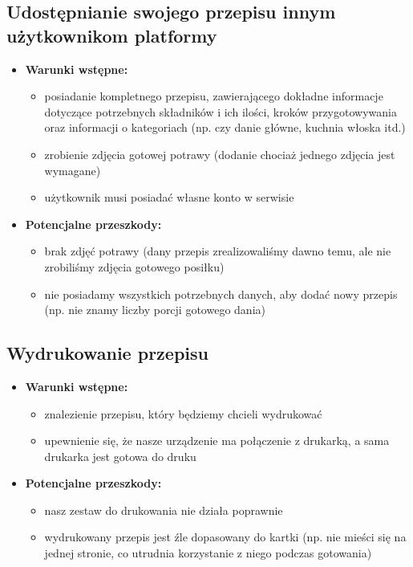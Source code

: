 \documentclass{article}
\begin{document}
\subsection{Udostępnianie swojego przepisu innym użytkownikom platformy}
  \begin{itemize}
    \item \textbf{Warunki wstępne:}
      \begin{itemize}
        \item posiadanie kompletnego przepisu, zawierającego dokładne informacje dotyczące potrzebnych składników i ich ilości, kroków przygotowywania oraz informacji o kategoriach (np. czy danie główne, kuchnia włoska itd.)
        \item zrobienie zdjęcia gotowej potrawy (dodanie chociaż jednego zdjęcia jest wymagane)
        \item użytkownik musi posiadać własne konto w serwisie
      \end{itemize}
    \item \textbf{Potencjalne przeszkody:}
      \begin{itemize}
        \item brak zdjęć potrawy (dany przepis zrealizowaliśmy dawno temu, ale nie zrobiliśmy zdjęcia gotowego posiłku)
        \item nie posiadamy wszystkich potrzebnych danych, aby dodać nowy przepis (np. nie znamy liczby porcji gotowego dania)
      \end{itemize}
  \end{itemize}
\subsection{Wydrukowanie przepisu}
  \begin{itemize}
    \item \textbf{Warunki wstępne:}
      \begin{itemize}
        \item znalezienie przepisu, który będziemy chcieli wydrukować
        \item upewnienie się, że nasze urządzenie ma połączenie z drukarką, a sama drukarka jest gotowa do druku
      \end{itemize}
    \item \textbf{Potencjalne przeszkody:}
      \begin{itemize}
        \item nasz zestaw do drukowania nie działa poprawnie
        \item wydrukowany przepis jest źle dopasowany do kartki (np. nie mieści się na jednej stronie, co utrudnia korzystanie z niego podczas gotowania)
      \end{itemize}
  \end{itemize}
\end{document}
